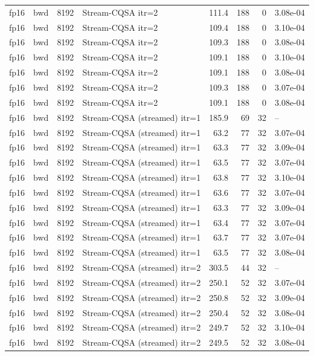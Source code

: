 \begin{tabular}{llrlrrrl}
fp16 & bwd & 8192 & Stream-CQSA itr=2 & 111.4 & 188 & 0 & 3.08e-04 \\
fp16 & bwd & 8192 & Stream-CQSA itr=2 & 109.4 & 188 & 0 & 3.10e-04 \\
fp16 & bwd & 8192 & Stream-CQSA itr=2 & 109.3 & 188 & 0 & 3.08e-04 \\
fp16 & bwd & 8192 & Stream-CQSA itr=2 & 109.1 & 188 & 0 & 3.10e-04 \\
fp16 & bwd & 8192 & Stream-CQSA itr=2 & 109.1 & 188 & 0 & 3.08e-04 \\
fp16 & bwd & 8192 & Stream-CQSA itr=2 & 109.3 & 188 & 0 & 3.07e-04 \\
fp16 & bwd & 8192 & Stream-CQSA itr=2 & 109.1 & 188 & 0 & 3.08e-04 \\
fp16 & bwd & 8192 & Stream-CQSA (streamed) itr=1 & 185.9 & 69 & 32 & -- \\
fp16 & bwd & 8192 & Stream-CQSA (streamed) itr=1 & 63.2 & 77 & 32 & 3.07e-04 \\
fp16 & bwd & 8192 & Stream-CQSA (streamed) itr=1 & 63.3 & 77 & 32 & 3.09e-04 \\
fp16 & bwd & 8192 & Stream-CQSA (streamed) itr=1 & 63.5 & 77 & 32 & 3.07e-04 \\
fp16 & bwd & 8192 & Stream-CQSA (streamed) itr=1 & 63.8 & 77 & 32 & 3.10e-04 \\
fp16 & bwd & 8192 & Stream-CQSA (streamed) itr=1 & 63.6 & 77 & 32 & 3.07e-04 \\
fp16 & bwd & 8192 & Stream-CQSA (streamed) itr=1 & 63.3 & 77 & 32 & 3.09e-04 \\
fp16 & bwd & 8192 & Stream-CQSA (streamed) itr=1 & 63.4 & 77 & 32 & 3.07e-04 \\
fp16 & bwd & 8192 & Stream-CQSA (streamed) itr=1 & 63.7 & 77 & 32 & 3.07e-04 \\
fp16 & bwd & 8192 & Stream-CQSA (streamed) itr=1 & 63.5 & 77 & 32 & 3.08e-04 \\
fp16 & bwd & 8192 & Stream-CQSA (streamed) itr=2 & 303.5 & 44 & 32 & -- \\
fp16 & bwd & 8192 & Stream-CQSA (streamed) itr=2 & 250.1 & 52 & 32 & 3.07e-04 \\
fp16 & bwd & 8192 & Stream-CQSA (streamed) itr=2 & 250.8 & 52 & 32 & 3.09e-04 \\
fp16 & bwd & 8192 & Stream-CQSA (streamed) itr=2 & 250.4 & 52 & 32 & 3.08e-04 \\
fp16 & bwd & 8192 & Stream-CQSA (streamed) itr=2 & 249.7 & 52 & 32 & 3.10e-04 \\
fp16 & bwd & 8192 & Stream-CQSA (streamed) itr=2 & 249.5 & 52 & 32 & 3.08e-04 \\

\end{tabular}
